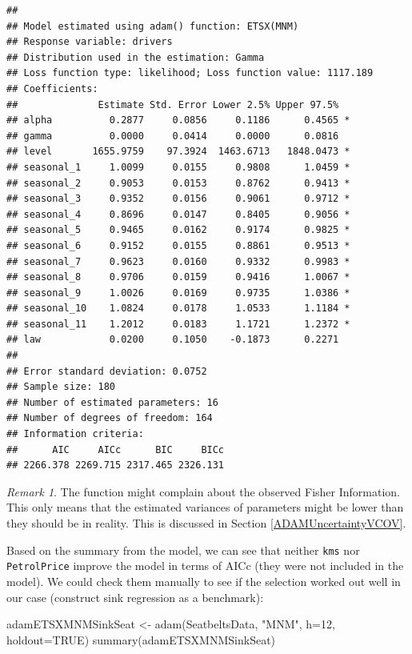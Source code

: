 \documentclass[
]{book}
\newenvironment{Shaded}{\begin{snugshade}}{\end{snugshade}}
\newcommand{\AttributeTok}[1]{\textcolor[rgb]{0.77,0.63,0.00}{#1}}
\newcommand{\ConstantTok}[1]{\textcolor[rgb]{0.00,0.00,0.00}{#1}}
\newcommand{\DecValTok}[1]{\textcolor[rgb]{0.00,0.00,0.81}{#1}}
\newcommand{\FunctionTok}[1]{\textcolor[rgb]{0.00,0.00,0.00}{#1}}
\newcommand{\NormalTok}[1]{#1}
\newcommand{\OtherTok}[1]{\textcolor[rgb]{0.56,0.35,0.01}{#1}}
\newcommand{\StringTok}[1]{\textcolor[rgb]{0.31,0.60,0.02}{#1}}
\theoremstyle{definition}
\theoremstyle{definition}
\theoremstyle{definition}
\theoremstyle{definition}
\theoremstyle{remark}
\newtheorem*{remark}{Remark}
\begin{document}
\begin{verbatim}
## 
## Model estimated using adam() function: ETSX(MNM)
## Response variable: drivers
## Distribution used in the estimation: Gamma
## Loss function type: likelihood; Loss function value: 1117.189
## Coefficients:
##              Estimate Std. Error Lower 2.5% Upper 97.5%  
## alpha          0.2877     0.0856     0.1186      0.4565 *
## gamma          0.0000     0.0414     0.0000      0.0816  
## level       1655.9759    97.3924  1463.6713   1848.0473 *
## seasonal_1     1.0099     0.0155     0.9808      1.0459 *
## seasonal_2     0.9053     0.0153     0.8762      0.9413 *
## seasonal_3     0.9352     0.0156     0.9061      0.9712 *
## seasonal_4     0.8696     0.0147     0.8405      0.9056 *
## seasonal_5     0.9465     0.0162     0.9174      0.9825 *
## seasonal_6     0.9152     0.0155     0.8861      0.9513 *
## seasonal_7     0.9623     0.0160     0.9332      0.9983 *
## seasonal_8     0.9706     0.0159     0.9416      1.0067 *
## seasonal_9     1.0026     0.0169     0.9735      1.0386 *
## seasonal_10    1.0824     0.0178     1.0533      1.1184 *
## seasonal_11    1.2012     0.0183     1.1721      1.2372 *
## law            0.0200     0.1050    -0.1873      0.2271  
## 
## Error standard deviation: 0.0752
## Sample size: 180
## Number of estimated parameters: 16
## Number of degrees of freedom: 164
## Information criteria:
##      AIC     AICc      BIC     BICc 
## 2266.378 2269.715 2317.465 2326.131
\end{verbatim}

\begin{remark}
The function might complain about the observed Fisher Information. This only means that the estimated variances of parameters might be lower than they should be in reality. This is discussed in Section \ref{ADAMUncertaintyVCOV}.
\end{remark}

Based on the summary from the model, we can see that neither \texttt{kms} nor \texttt{PetrolPrice} improve the model in terms of AICc (they were not included in the model). We could check them manually to see if the selection worked out well in our case (construct sink regression as a benchmark):

\begin{Shaded}
\begin{Highlighting}[]
\NormalTok{adamETSXMNMSinkSeat }\OtherTok{\textless{}{-}} \FunctionTok{adam}\NormalTok{(SeatbeltsData, }\StringTok{"MNM"}\NormalTok{,}
                             \AttributeTok{h=}\DecValTok{12}\NormalTok{, }\AttributeTok{holdout=}\ConstantTok{TRUE}\NormalTok{)}
\FunctionTok{summary}\NormalTok{(adamETSXMNMSinkSeat)}
\end{Highlighting}
\end{Shaded}
\end{document}
